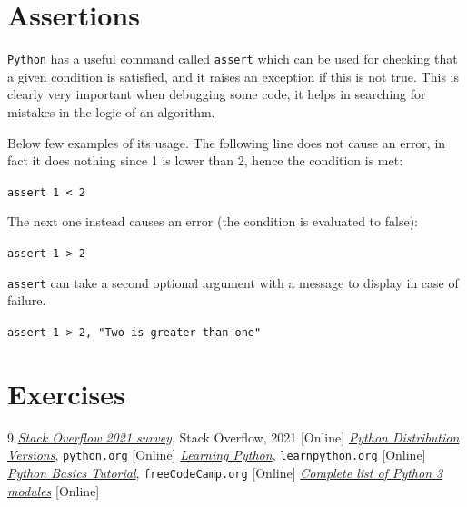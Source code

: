 \section{Assertions}
\texttt{Python} has a useful command called \texttt{assert} which can be used for checking that a given condition is satisfied, and it raises an exception if this is not true. This is clearly very important when debugging some code, it helps in searching for mistakes in the logic of an algorithm.

Below few examples of its usage. The following line does not cause an error, in fact it does nothing since 1 is lower than 2, hence the condition is met:

\lstinline[language=iPython]|assert 1 < 2|

\noindent
The next one instead causes an error (the condition is evaluated to false): 

\lstinline[language=iPython]|assert 1 > 2|

\noindent
\texttt{assert} can take a second optional argument with a message to display in case of failure.

\lstinline[language=iPython]|assert 1 > 2, "Two is greater than one"|

\section*{Exercises}


\begin{thebibliography}{9}
 \href{https://insights.stackoverflow.com/survey/2021}{\emph{Stack Overflow 2021 survey}}, Stack Overflow, 2021 [Online]
 \href{https://www.python.org/downloads/}{\emph{Python Distribution Versions}}, \texttt{python.org} [Online]
 \href{https://www.learnpython.org/it/}{\emph{Learning Python}}, \texttt{learnpython.org} [Online]
 \href{https://www.youtube.com/watch?v=8DvywoWv6fI}{\emph{Python Basics Tutorial}}, \texttt{freeCodeCamp.org} [Online]
 \href{https://docs.python.org/3/py-modindex.html}{\emph{Complete list of Python 3 modules}} [Online]
\end{thebibliography}
